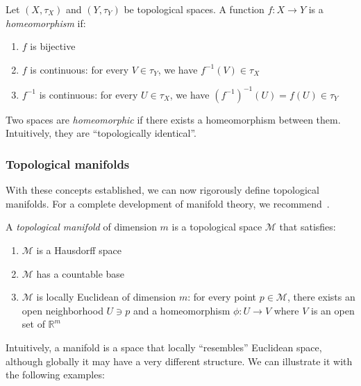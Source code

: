 \begin{definition}[Homeomorphism]\label{def:homeomorfismo}
Let $(X, \tau_X)$ and $(Y, \tau_Y)$ be topological spaces. A function $f: X \to Y$ is a \textit{homeomorphism} if:
\begin{enumerate}
	\item $f$ is bijective
	\item $f$ is continuous: for every $V \in \tau_Y$, we have $f^{-1}(V) \in \tau_X$
	\item $f^{-1}$ is continuous: for every $U \in \tau_X$, we have $(f^{-1})^{-1}(U) = f(U) \in \tau_Y$
\end{enumerate}
Two spaces are \textit{homeomorphic} if there exists a homeomorphism between them. Intuitively, they are ``topologically identical''.
\end{definition}

\subsubsection{Topological manifolds}\label{subsubsec:variedades_topologicas}

With these concepts established, we can now rigorously define topological manifolds. For a complete development of manifold theory, we recommend~\citet{lee2012introduction}.

\begin{definition}\label{def:variedad_topologica}
A \textit{topological manifold} of dimension $m$ is a topological space $\mathcal{M}$ that satisfies:
\begin{enumerate}
	\item $\mathcal{M}$ is a Hausdorff space
	\item $\mathcal{M}$ has a countable base
	\item $\mathcal{M}$ is locally Euclidean of dimension $m$: for every point $p \in \mathcal{M}$, there exists an open neighborhood $U \ni p$ and a homeomorphism $\phi: U \to V$ where $V$ is an open set of $\mathbb{R}^m$
\end{enumerate}
\end{definition}

Intuitively, a manifold is a space that locally ``resembles'' Euclidean space, although globally it may have a very different structure. We can illustrate it with the following examples:

